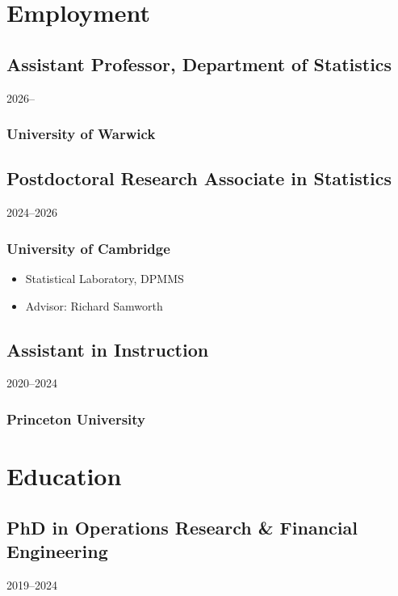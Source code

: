 \documentclass{wgu-cv}
\begin{document}
\maketitle

\section{Employment}

\subsection{Assistant Professor, Department of Statistics}
{2026--}
\subsubsection{University of Warwick}

\subsection{Postdoctoral Research Associate in Statistics}
{2024--2026}
\subsubsection{University of Cambridge}

\begin{itemize}

  \item Statistical Laboratory, DPMMS

  \item Advisor: Richard Samworth

\end{itemize}

\subsection{Assistant in Instruction}
{2020--2024}
\subsubsection{Princeton University}

\vspace*{3mm}
\section{Education}

\subsection{PhD in Operations Research \& Financial Engineering}
{2019--2024}
\end{document}
